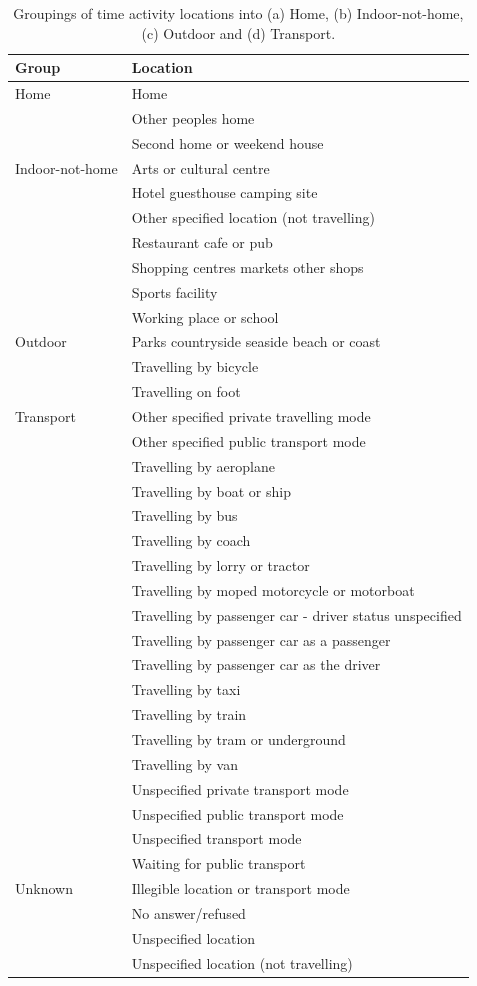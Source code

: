 \documentclass{article}
\begin{document}
\begin{table}[ht]
\centering
\caption{Groupings of time activity locations into (a) Home, (b) Indoor-not-home, (c) Outdoor and (d) Transport.}\label{tab::groupings}
\begin{tabular}{ll}
  \hline
Group & Location \\ 
  \hline
Home & Home \\ 
   & Other peoples home \\ 
   & Second home or weekend house \\ 
  Indoor-not-home & Arts or cultural centre \\ 
   & Hotel guesthouse camping site \\ 
   & Other specified location (not travelling) \\ 
   & Restaurant cafe or pub \\ 
   & Shopping centres markets other shops \\ 
   & Sports facility \\ 
   & Working place or school \\ 
  Outdoor & Parks countryside seaside beach or coast \\ 
   & Travelling by bicycle \\ 
   & Travelling on foot \\ 
  Transport & Other specified private travelling mode \\ 
   & Other specified public transport mode \\ 
   & Travelling by aeroplane \\ 
   & Travelling by boat or ship \\ 
   & Travelling by bus \\ 
   & Travelling by coach \\ 
   & Travelling by lorry or tractor \\ 
   & Travelling by moped motorcycle or motorboat \\ 
   & Travelling by passenger car - driver status unspecified \\ 
   & Travelling by passenger car as a passenger \\ 
   & Travelling by passenger car as the driver \\ 
   & Travelling by taxi \\ 
   & Travelling by train \\ 
   & Travelling by tram or underground \\ 
   & Travelling by van \\ 
   & Unspecified private transport mode \\ 
   & Unspecified public transport mode \\ 
   & Unspecified transport mode \\ 
   & Waiting for public transport \\ 
  Unknown & Illegible location or transport mode \\ 
   & No answer/refused \\ 
   & Unspecified location \\ 
   & Unspecified location (not travelling) \\ 
   \hline
\end{tabular}
\end{table}
\end{document}
